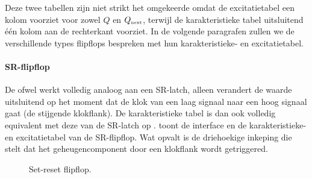 Deze twee tabellen zijn niet strikt het omgekeerde omdat de excitatietabel een kolom voorziet voor zowel $Q$ en $Q_{\mbox{\tiny{next}}}{}$, terwijl de karakteristieke tabel uitsluitend \'e\'en kolom aan de rechterkant voorziet. In de volgende paragrafen zullen we de verschillende types flipflops bespreken met hun karakteristieke- en excitatietabel.

\paragraph{SR-flipflop}
De  ofwel  werkt volledig analoog aan een SR-latch, alleen verandert de waarde uitsluitend op het moment dat de klok van een laag signaal naar een hoog signaal gaat (de stijgende klokflank). De karakteristieke tabel is dan ook volledig equivalent met deze van de SR-latch op .  toont de interface en de karakteristieke- en excitatietabel van de SR-flipflop. Wat opvalt is de driehoekige inkeping die stelt dat het geheugencomponent door een klokflank wordt getriggered.

\begin{figure}[hbt]
\centering
{}
\caption{Set-reset flipflop.}
\end{figure}

